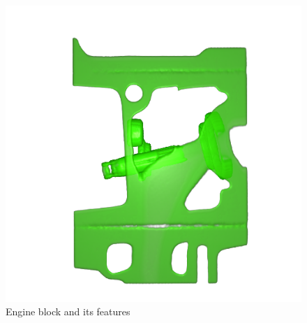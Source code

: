 \begin{figure}
\begin{minipage}{.33\textwidth}
		\subcaption{}
	\end{minipage}~
	\begin{minipage}{.33\textwidth}
		\includegraphics[width=1\linewidth]{images/engine_naive_2}
		\subcaption{}
	\end{minipage}
	\caption{Engine block and its features}
	\label{fig:engine_naive}
\end{figure}

